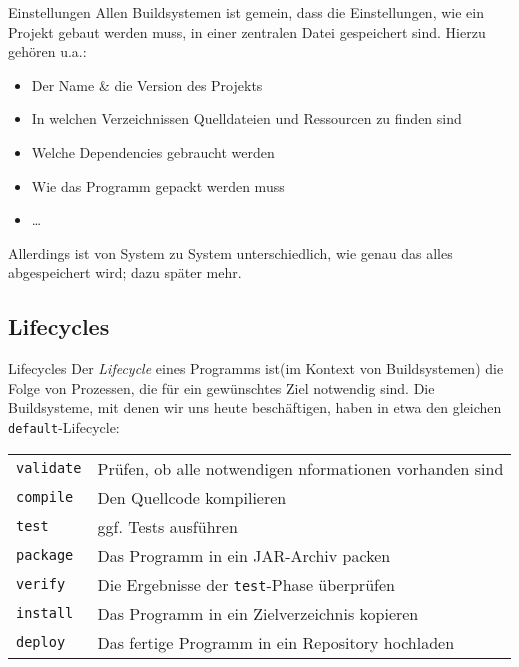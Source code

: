\begin{frame}{Einstellungen}
    Allen Buildsystemen ist gemein, dass die Einstellungen, wie ein Projekt gebaut werden muss, in einer zentralen Datei gespeichert sind. Hierzu gehören u.a.:
    \begin{itemize}[<+->]
        \item Der Name \& die Version des Projekts
        \item In welchen Verzeichnissen Quelldateien und Ressourcen zu finden sind
        \item Welche Dependencies gebraucht werden
        \item Wie das Programm gepackt werden muss
        \item \dots
    \end{itemize}
    \onslide<+->
    Allerdings ist von System zu System unterschiedlich, wie genau das alles abgespeichert wird; dazu später mehr.
\end{frame}

\subsection{Lifecycles}
\begin{frame}[fragile]{Lifecycles}
    \onslide<+->
    Der \textit{Lifecycle} eines Programms ist(im Kontext von Buildsystemen) die Folge von Prozessen, die für ein gewünschtes Ziel notwendig sind.
    Die Buildsysteme, mit denen wir uns heute beschäftigen, haben in etwa den gleichen \texttt{default}-Lifecycle:\\
    \onslide<+->
    \begin{tabular}{ l | l }
        \texttt{validate} & Prüfen, ob alle notwendigen nformationen vorhanden sind\\
        \texttt{compile} & Den Quellcode kompilieren\\
        \texttt{test} & ggf. Tests ausführen\\
        \texttt{package} & Das Programm in ein JAR-Archiv packen\\
        \texttt{verify} & Die Ergebnisse der \texttt{test}-Phase überprüfen\\
        \texttt{install} & Das Programm in ein Zielverzeichnis kopieren\\
        \texttt{deploy} & Das fertige Programm in ein Repository hochladen\\
    \end{tabular}
\end{frame}

